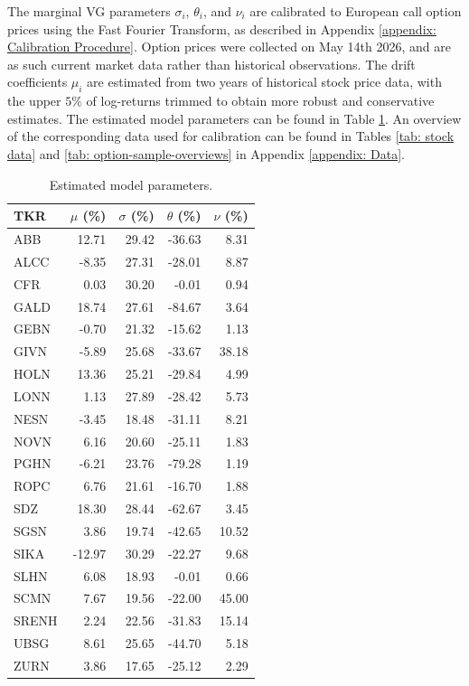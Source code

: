 The marginal VG parameters $\sigma_i$, $\theta_i$, and $\nu_i$ are calibrated to European call option prices using the Fast Fourier Transform, as described in Appendix \ref{appendix: Calibration Procedure}. Option prices were collected on May 14th 2026, and are as such current market data rather than historical observations. The drift coefficients $\mu_i$ are estimated from two years of historical stock price data, with the upper $5\%$ of log-returns trimmed to obtain more robust and conservative estimates. The estimated model parameters can be found in Table \ref{tab: parameter estimates percent}. An overview of the corresponding data used for calibration can be found in Tables \ref{tab: stock data} and \ref{tab: option-sample-overviews} in Appendix \ref{appendix: Data}. 
\begin{table}[!htbp]
    \centering
    \begin{tabular}{lrrrr}
        \toprule
        TKR & $\mu$ (\%) & $\sigma$ (\%) & $\theta$ (\%) & $\nu$ (\%) \\
        \midrule
        ABB   &  12.71 & 29.42 & -36.63 &  8.31 \\
        ALCC  &  -8.35 & 27.31 & -28.01 &  8.87 \\
        CFR   &   0.03 & 30.20 &  -0.01 &  0.94 \\
        GALD  &  18.74 & 27.61 & -84.67 &  3.64 \\
        GEBN  &  -0.70 & 21.32 & -15.62 &  1.13 \\
        GIVN  &  -5.89 & 25.68 & -33.67 & 38.18 \\
        HOLN  &  13.36 & 25.21 & -29.84 &  4.99 \\
        LONN  &   1.13 & 27.89 & -28.42 &  5.73 \\
        NESN  &  -3.45 & 18.48 & -31.11 &  8.21 \\
        NOVN  &   6.16 & 20.60 & -25.11 &  1.83 \\
        PGHN  &  -6.21 & 23.76 & -79.28 &  1.19 \\
        ROPC  &   6.76 & 21.61 & -16.70 &  1.88 \\
        SDZ   &  18.30 & 28.44 & -62.67 &  3.45 \\
        SGSN  &   3.86 & 19.74 & -42.65 & 10.52 \\
        SIKA  & -12.97 & 30.29 & -22.27 &  9.68 \\
        SLHN  &   6.08 & 18.93 &  -0.01 &  0.66 \\
        SCMN  &   7.67 & 19.56 & -22.00 & 45.00 \\
        SRENH &   2.24 & 22.56 & -31.83 & 15.14 \\
        UBSG  &   8.61 & 25.65 & -44.70 &  5.18 \\
        ZURN  &   3.86 & 17.65 & -25.12 &  2.29 \\
        \bottomrule
    \end{tabular}
    \caption{Estimated model parameters.}
    \label{tab: parameter estimates percent}
\end{table}

